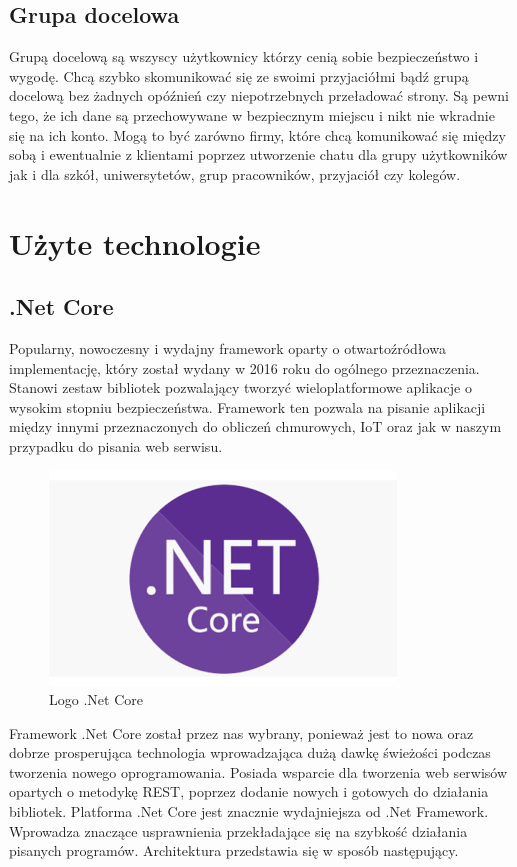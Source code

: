 \documentclass[12pt,a4paper]{article}
\begin{document}
\subsection{Grupa docelowa}
\hspace*{0.7cm} Grupą docelową są wszyscy użytkownicy którzy cenią sobie bezpieczeństwo i wygodę. Chcą szybko skomunikować się ze swoimi przyjaciółmi bądź grupą docelową
bez żadnych opóźnień czy niepotrzebnych przeładować strony. Są pewni tego, że ich dane są przechowywane w bezpiecznym miejscu i nikt nie wkradnie się na ich
konto. Mogą to być zarówno firmy, które chcą komunikować się między sobą i ewentualnie z klientami poprzez utworzenie chatu dla grupy użytkowników jak i dla szkół, uniwersytetów, grup pracowników, przyjaciół czy kolegów. 


\section{Użyte technologie}

\subsection{.Net Core} 			%
\hspace*{0.7cm} Popularny, nowoczesny i wydajny framework oparty o otwartoźródłowa implementację, który został wydany w 2016 roku do ogólnego przeznaczenia. Stanowi zestaw bibliotek pozwalający tworzyć wieloplatformowe aplikacje o wysokim stopniu bezpieczeństwa. Framework ten pozwala na pisanie aplikacji między innymi przeznaczonych do obliczeń chmurowych, IoT oraz jak w naszym przypadku do pisania web serwisu. 

\begin{figure}[h]
	\centering
	\includegraphics[width=0.3\linewidth]{dotnet5_platform}
	\caption{Logo .Net Core}
	\label{fig:dotnet5platform}
\end{figure}

Framework .Net Core został przez nas wybrany, ponieważ jest to nowa oraz dobrze prosperująca technologia wprowadzająca dużą dawkę świeżości podczas tworzenia nowego oprogramowania. Posiada wsparcie dla tworzenia web serwisów opartych o metodykę REST, poprzez dodanie nowych i gotowych do działania bibliotek. Platforma .Net Core jest znacznie wydajniejsza od .Net Framework. Wprowadza znaczące usprawnienia przekładające się na szybkość działania pisanych programów. Architektura przedstawia się w sposób następujący.\newline
\end{document}
